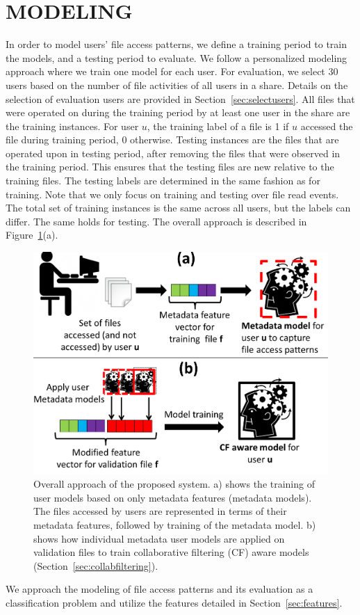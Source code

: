 \section{\uppercase{Modeling}}
\label{sec:models}
In order to model users' file access patterns, we define a training
period to train the models, and a testing period to evaluate. We
follow a personalized modeling approach where we train one model for
each user.
%
%
For evaluation, we select 30
users based on the number of file activities of all users in a
share.
%
%
Details on the selection of evaluation users are provided in
Section~\ref{sec:selectusers}. All files that were operated on during
the training period by at least one user in the share are the training
instances. For user $u$, the training label of a file is 1 if $u$
accessed the file during training period, 0 otherwise.  Testing
instances are the files that are operated upon in testing period,
after removing the files that were observed in the training
period. This ensures that the testing files are new relative to the
training files. The testing labels are determined in the same fashion
as for training.  Note that we only focus on training and testing
over file read events. The total set of training instances is
the same across all users, but the labels can differ. The same holds
for testing.  The overall approach is described in
Figure~\ref{fig:overallApproach}(a).
\begin{figure}[h!]
\begin{center}
\includegraphics[width=0.95\linewidth]{FileAccess/figs/overall_framework}
\caption{Overall approach of the proposed system. a) shows the training of user models based on only metadata features (metadata models). The files accessed by users are represented in terms of their metadata features, followed by training of the metadata model. b) shows how individual metadata user models are applied on validation files to train collaborative filtering (CF) aware models (Section~\ref{sec:collabfiltering}). } 
\label{fig:overallApproach}
\end{center}
\end{figure}
We approach the modeling of file access patterns and its evaluation as
a classification problem and utilize the features detailed in
Section~\ref{sec:features}.

